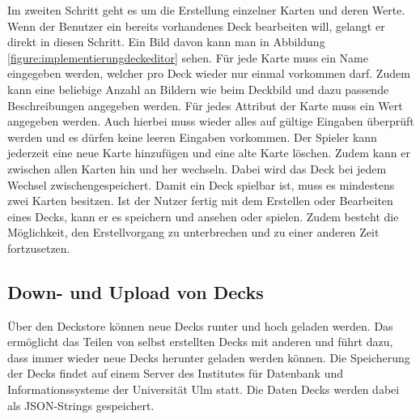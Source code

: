 Im zweiten Schritt geht es um die Erstellung einzelner Karten und deren Werte. Wenn der Benutzer ein bereits vorhandenes Deck bearbeiten will, gelangt er direkt in diesen Schritt. Ein Bild davon kann man in Abbildung \ref{figure:implementierungdeckeditor} sehen. Für jede Karte muss ein Name eingegeben werden, welcher pro Deck wieder nur einmal vorkommen darf. Zudem kann eine beliebige Anzahl an Bildern wie beim Deckbild und dazu passende Beschreibungen angegeben werden. Für jedes Attribut der Karte muss ein Wert angegeben werden. Auch hierbei muss wieder alles auf gültige Eingaben überprüft werden und es dürfen keine leeren Eingaben vorkommen. Der Spieler kann jederzeit eine neue Karte hinzufügen und eine alte Karte löschen. Zudem kann er zwischen allen Karten hin und her wechseln. Dabei wird das Deck bei jedem Wechsel zwischengespeichert. Damit ein Deck spielbar ist, muss es mindestens zwei Karten besitzen. Ist der Nutzer fertig mit dem Erstellen oder Bearbeiten eines Decks, kann er es speichern und ansehen oder spielen. Zudem besteht die Möglichkeit, den Erstellvorgang zu unterbrechen und zu einer anderen Zeit fortzusetzen.

\subsection{Down- und Upload von Decks}
\label{sec:implementierung:besonderheiten:deckdownload }

Über den Deckstore können neue Decks runter und hoch geladen werden. Das ermöglicht das Teilen von selbst erstellten Decks mit anderen und führt dazu, dass immer wieder neue Decks herunter geladen werden können. Die Speicherung der Decks findet auf einem Server des Institutes für Datenbank und Informationssysteme der Universität Ulm statt. Die Daten Decks werden dabei als JSON-Strings gespeichert. 

